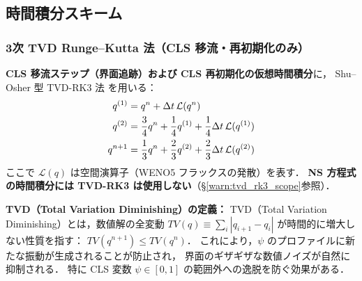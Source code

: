 %
%
\subsection{時間積分スキーム}
\label{sec:time_int}

\subsubsection{3次 TVD Runge--Kutta 法（CLS 移流・再初期化のみ）}

\textbf{CLS 移流ステップ（界面追跡）および CLS 再初期化の仮想時間積分}に，
Shu--Osher 型 TVD-RK3 法 \cite{ShuOsher1988} を用いる：
\begin{align}
  q^{(1)} &= q^n + \Delta t \, \mathcal{L}(q^n) \notag\\
  q^{(2)} &= \frac{3}{4}q^n + \frac{1}{4}q^{(1)} + \frac{1}{4}\Delta t\,\mathcal{L}(q^{(1)}) \notag\\
  q^{n+1} &= \frac{1}{3}q^n + \frac{2}{3}q^{(2)} + \frac{2}{3}\Delta t\,\mathcal{L}(q^{(2)})
  \label{eq:tvd_rk3}
\end{align}
ここで $\mathcal{L}(q)$ は空間演算子（WENO5 フラックスの発散）を表す．
\textbf{NS 方程式の時間積分には TVD-RK3 は使用しない}（§\ref{warn:tvd_rk3_scope}参照）．

\noindent\textbf{TVD（Total Variation Diminishing）の定義：}
TVD（Total Variation Diminishing）とは，数値解の全変動
$TV(q) \equiv \sum_i |q_{i+1} - q_i|$ が時間的に増大しない性質を指す：
$TV(q^{n+1}) \leq TV(q^n)$．
これにより，$\psi$ のプロファイルに新たな振動が生成されることが防止され，
界面のギザギザな数値ノイズが自然に抑制される．
特に CLS 変数 $\psi \in [0,1]$ の範囲外への逸脱を防ぐ効果がある．

